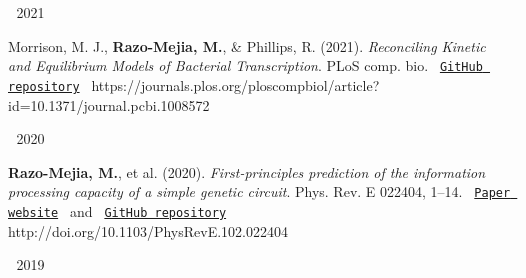 
\begin{cventries}
\cventry
{$\;$}
{2021}
{$\;$}
{$\;$}
{
  \begin{cvitems} %
      \item {
        \begin{flushleft}
          Morrison, M. J., \textbf{Razo-Mejia, M.}, \& Phillips, R. (2021).
          \textit{Reconciling Kinetic and Equilibrium Models of Bacterial
          Transcription}. PLoS comp. bio. \texttt{
          \href{https://github.com/RPGroup-PBoC/bursty_transcription}{GitHub repository}
          }
          \linebreak
          https://journals.plos.org/ploscompbiol/article?id=10.1371/journal.pcbi.1008572
        \end{flushleft}
      }
  \end{cvitems}
}
  \cventry
    {$\;$}
    {2020}
    {$\;$}
    {$\;$}
    {
      \begin{cvitems} %
          \item {
            \begin{flushleft}
              \textbf{Razo-Mejia, M.}, et al. (2020).
              \textit{First-principles prediction of the information processing
              capacity of a simple genetic circuit}. Phys. Rev. E 022404, 1–14.
              \texttt{
              \href{https://www.rpgroup.caltech.edu/chann_cap/}{Paper website} 
              }
              and
              \texttt{
              \href{https://github.com/RPGroup-PBoC/chann_cap}{GitHub repository}
              }
              \linebreak
              http://doi.org/10.1103/PhysRevE.102.022404
            \end{flushleft}
          }
      \end{cvitems}
    }
  \cventry
    {$\;$}
    {2019}
    {$\;$}
    {$\;$}
    {
}
\end{cventries}
